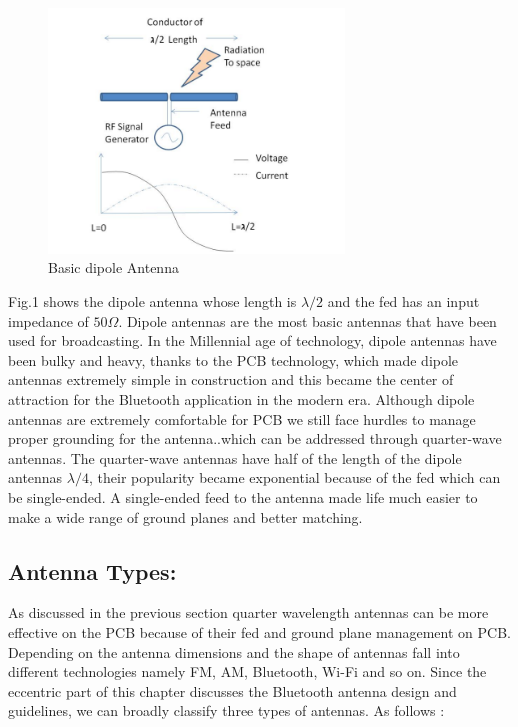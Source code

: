 \begin{figure}[h]
	\centering
	\includegraphics[width=0.7\textwidth]{Chap03/Figures/Basic_Antenna.PNG}
	\caption{Basic dipole Antenna}
	\label{BASIC_ANTENNA}
\end{figure}

Fig.1  shows the dipole antenna whose length is  $\lambda/2$ and the fed has an input impedance of $50\Omega $.
Dipole antennas are the most basic antennas that have been used for broadcasting.
In the Millennial age of technology, dipole antennas have been bulky and heavy, thanks to the PCB technology, which made dipole antennas extremely simple in construction and this became the center of attraction for the Bluetooth application in the modern era.
Although dipole antennas are extremely comfortable for PCB we still face hurdles to manage proper grounding for the antenna..which can be addressed through quarter-wave antennas.
The quarter-wave antennas have half of the length of the dipole antennas  $\lambda/4$, their popularity became exponential because of the fed which can be single-ended.
A single-ended feed to the antenna made life much easier to make a wide range of ground planes and better matching.

\subsection{Antenna Types:}

As discussed in the previous section quarter wavelength antennas can be more effective on the PCB because of their fed and ground plane management on PCB.
Depending on the antenna dimensions and the shape of antennas fall into different technologies namely FM, AM, Bluetooth, Wi-Fi and so on.
Since the eccentric part of this chapter discusses the Bluetooth antenna design and guidelines, we can broadly classify three types of antennas. As follows :

